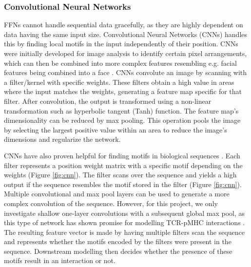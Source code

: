 \subsubsection{Convolutional Neural Networks} \label{cnn}
FFNs cannot handle sequential data gracefully, as they are highly dependent on data having the same input size. Convolutional Neural Networks (CNNs) handles this by finding local motifs in the input independently of their position. CNNs were initially developed for image analysis to identify certain pixel arrangements, which can then be combined into more complex features resembling e.g. facial features being combined into a face \cite{NIPS2012_c399862d}. CNNs convolute an image by scanning with a filter/kernel with specific weights. These filters obtain a high value in areas where the input matches the weights, generating a feature map specific for that filter. After convolution, the output is transformed using a  non-linear transformation such as hyperbolic tangent (Tanh) function. The feature map's dimensionality can be reduced by max pooling. This operation pools the image by selecting the largest positive value within an area to reduce the image's dimensions and regularize the network.

CNNs have also proven helpful for finding motifs in biological sequences \cite{Jurtz2017AnSolutions, Aoki2018ConvolutionalSequences}. Each filter represents a position weight matrix with a specific motif depending on the weights (Figure \ref{fig:cnn}). The filter scans over the sequence and yields a high output if the sequence resembles the motif stored in the filter (Figure \ref{fig:cnn}). Multiple convolutional and max pool layers can be used to generate a more complex convolution of the sequence. However, for this project, we only investigate shallow one-layer convolutions with a subsequent global max pool, as this type of network has shown promise for modelling TCR-pMHC interactions \cite{Montemurro2021NetTCR-2.0Data}. The resulting feature vector is made by having multiple filters scan the sequence and represents whether the motifs encoded by the filters were present in the sequence. Downstream modelling then decides whether the presence of these motifs result in an interaction or not.

